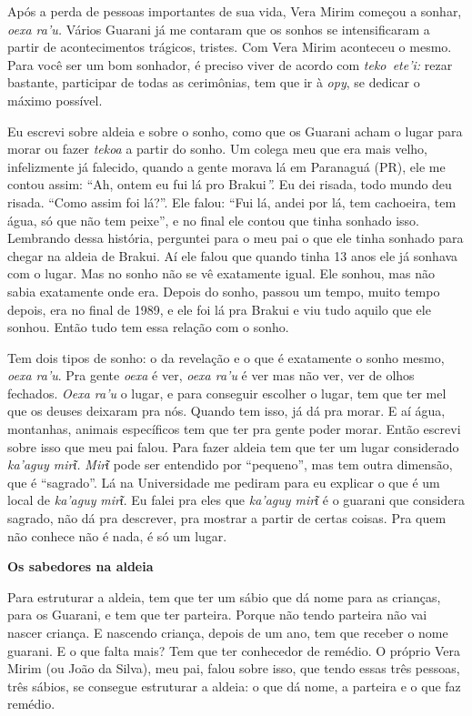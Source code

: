 Após a perda de pessoas importantes de sua vida, Vera Mirim começou a
sonhar, \emph{oexa ra'u.} Vários Guarani já me contaram que os sonhos se
intensificaram a partir de acontecimentos trágicos, tristes. Com Vera
Mirim aconteceu o mesmo. Para você ser um bom sonhador, é preciso viver
de acordo com \emph{teko~ete'i:} rezar bastante, participar de todas as
cerimônias, tem que ir à \emph{opy}, se dedicar o máximo possível.

Eu escrevi sobre aldeia e sobre o sonho, como que os Guarani acham o
lugar para morar ou fazer \emph{tekoa} a partir do sonho. Um colega meu
que era mais velho, infelizmente já falecido, quando a gente morava lá
em Paranaguá (PR), ele me contou assim: ``Ah, ontem eu fui lá pro
Brakui\emph{''.} Eu dei risada, todo mundo deu risada. ``Como assim foi
lá?''. Ele falou: ``Fui lá, andei por lá, tem cachoeira, tem água, só
que não tem peixe'', e no final ele contou que tinha sonhado isso.
Lembrando dessa história, perguntei para o meu pai o que ele tinha
sonhado para chegar na aldeia de Brakui. Aí ele falou que quando tinha
13 anos ele já sonhava com o lugar. Mas no sonho não se vê exatamente
igual. Ele sonhou, mas não sabia exatamente onde era. Depois do sonho,
passou um tempo, muito tempo depois, era no final de 1989, e ele foi lá
pra Brakui e viu tudo aquilo que ele sonhou. Então tudo tem essa relação
com o sonho.

Tem dois tipos de sonho: o da revelação e o que é exatamente o sonho
mesmo, \emph{oexa ra'u}. Pra gente \emph{oexa} é ver, \emph{oexa ra'u} é
ver mas não ver, ver de olhos fechados. \emph{Oexa ra'u} o lugar, e para
conseguir escolher o lugar, tem que ter mel que os deuses deixaram pra
nós. Quando tem isso, já dá pra morar. E aí água, montanhas, animais
específicos tem que ter pra gente poder morar. Então escrevi sobre isso
que meu pai falou. Para fazer aldeia tem que ter um lugar considerado
\emph{ka'aguy mirῖ.} \emph{Mirῖ} pode ser entendido por ``pequeno'', mas
tem outra dimensão, que é ``sagrado''. Lá na Universidade me pediram
para eu explicar o que é um local de \emph{ka'aguy} \emph{mirῖ}. Eu
falei pra eles que \emph{ka'aguy mirῖ} é o guarani que considera
sagrado, não dá pra descrever, pra mostrar a partir de certas coisas.
Pra quem não conhece não é nada, é só um lugar.

\textbf{Os sabedores na aldeia}

Para estruturar a aldeia, tem que ter um sábio que dá nome para as
crianças, para os Guarani, e tem que ter parteira. Porque não tendo
parteira não vai nascer criança. E nascendo criança, depois de um ano,
tem que receber o nome guarani. E o que falta mais? Tem que ter
conhecedor de remédio. O próprio Vera Mirim (ou João da Silva), meu pai,
falou sobre isso, que tendo essas três pessoas, três sábios, se consegue
estruturar a aldeia: o que dá nome, a parteira e o que faz remédio.

